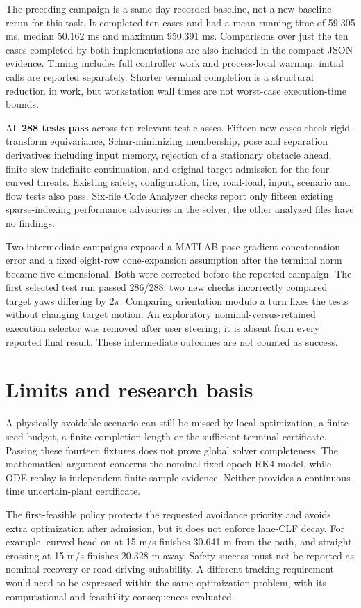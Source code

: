 \documentclass[11pt]{article}
\begin{document}
The preceding campaign is a same-day recorded baseline, not a new baseline
rerun for this task. It completed ten cases and had a mean running time of
59.305 ms, median 50.162 ms and maximum 950.391 ms. Comparisons over just the
ten cases completed by both implementations are also included in the compact
JSON evidence. Timing includes full controller work and process-local warmup;
initial calls are reported separately. Shorter terminal completion is a
structural reduction in work, but workstation wall times are not worst-case
execution-time bounds.

All \textbf{288 tests pass} across ten relevant test classes. Fifteen new
cases check rigid-transform equivariance, Schur-minimizing membership, pose
and separation derivatives including input memory, rejection of a stationary
obstacle ahead, finite-slew indefinite continuation, and original-target
admission for the four curved threats. Existing safety, configuration, tire,
road-load, input, scenario and flow tests also pass. Six-file Code Analyzer
checks report only fifteen existing sparse-indexing performance advisories
in the solver; the other analyzed files have no findings.

Two intermediate campaigns exposed a MATLAB pose-gradient concatenation error
and a fixed eight-row cone-expansion assumption after the terminal norm became
five-dimensional. Both were corrected before the reported campaign. The first
selected test run passed 286/288: two new checks incorrectly compared target
yaws differing by $2\pi$. Comparing orientation modulo a turn fixes the tests
without changing target motion. An exploratory nominal-versus-retained
execution selector was removed after user steering; it is absent from every
reported final result. These intermediate outcomes are not counted as success.

\section{Limits and research basis}
A physically avoidable scenario can still be missed by local optimization,
a finite seed budget, a finite completion length or the sufficient terminal
certificate. Passing these fourteen fixtures does not prove global solver
completeness. The mathematical argument concerns the nominal fixed-epoch RK4
model, while ODE replay is independent finite-sample evidence. Neither
provides a continuous-time uncertain-plant certificate.

The first-feasible policy protects the requested avoidance priority and avoids
extra optimization after admission, but it does not enforce lane-CLF decay.
For example, curved head-on at 15 m/s finishes 30.641 m from the path, and
straight crossing at 15 m/s finishes 20.328 m away. Safety success must not
be reported as nominal recovery or road-driving suitability. A different
tracking requirement would need to be expressed within the same optimization
problem, with its computational and feasibility consequences evaluated.
\end{document}
